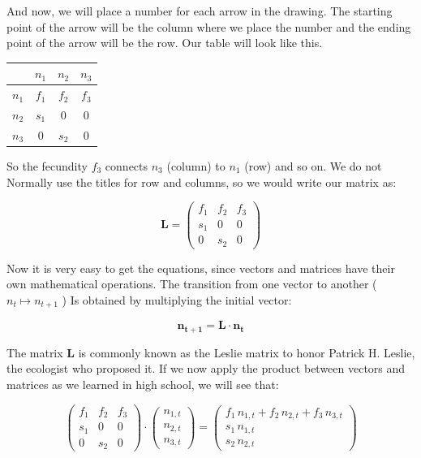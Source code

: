 \documentclass{tufte-book} %
\begin{document}
And now, we will place a number for each arrow in the drawing. The starting point of the arrow will be the column where we place the number and the ending point of the arrow will be the row. Our table will look like this.

\begin{center}
	\begin{tabular}{c|ccc}
		& $n_1$ & $n_2$ & $n_3$ \\
		\hline
		$n_1$ &$f_1$	&$f_2$	&$f_3$	\\
		$n_2$ &$s_1$	&0	&0	\\
		$n_3$ &0	&$s_2$	&0	\\
	\end{tabular}
\end{center}

So the fecundity $f_3$ connects $n_3$ (column) to $n_1$ (row) and so on. We do not Normally use the titles for row and columns, so we would write our matrix as:

\begin{equation}
\mathbf{L} =	\begin{pmatrix}
		f_1	&f_2	&f_3	\\
		s_1	&0	&0	\\
		0	&s_2	&0
	\end{pmatrix}
\end{equation}

Now it is very easy to get the equations, since vectors and matrices have their own mathematical operations. The transition from one vector to another ( $n_t \mapsto n_{t+1}$ ) Is obtained by multiplying the initial vector:

\begin{equation}
	\mathbf{n_{t+1}} =\mathbf{L} \cdot \mathbf{n_t}
	\label{fig:matequationL}
\end{equation}

The matrix $\mathbf{L}$ is commonly known as the Leslie matrix to honor Patrick H. Leslie, the ecologist who proposed it. If we now apply the product between vectors and matrices as we learned in high school, we will see that:

\begin{equation}
	 	\begin{pmatrix}
		f_1	&f_2	&f_3	\\
		s_1	&0	&0	\\
		0	&s_2	&0
	\end{pmatrix} \cdot \begin{pmatrix} n_{1,t}\\ n_{2,t} \\ n_{3,t}\end{pmatrix} = \begin{pmatrix} f_1 \,n_{1,t} + f_2 \,n_{2,t} + f_3 \,n_{3,t}\\ s_1 \, n_{1,t} \\ s_2 \, n_{2,t}\end{pmatrix}
\end{equation}
\end{document}
